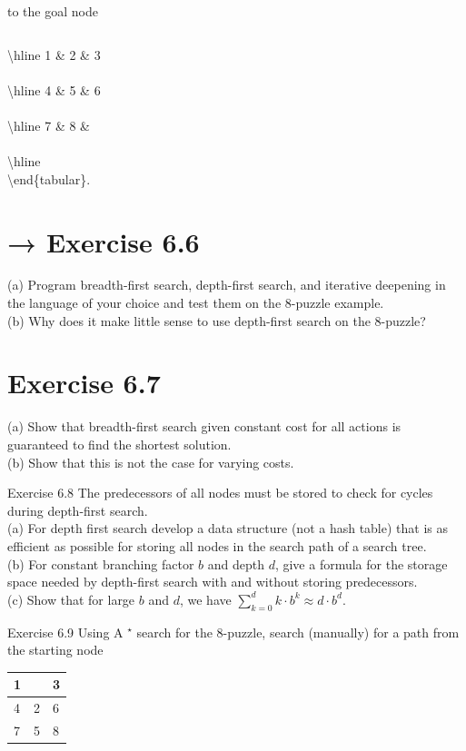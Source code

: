 \documentclass[10pt]{article}
\begin{document}
 to the goal node \begin{tabular}{|l|l|l|l|}
\end{tabular}

\textbackslash hline 1 \& 2 \& 3 \\
\\
\textbackslash hline 4 \& 5 \& 6 \\
\\
\textbackslash hline 7 \& 8 \& \\
\\
\textbackslash hline\\
\textbackslash end\{tabular\}.

\section*{→ Exercise 6.6}
(a) Program breadth-first search, depth-first search, and iterative deepening in the language of your choice and test them on the 8-puzzle example.\\
(b) Why does it make little sense to use depth-first search on the 8-puzzle?

\section*{Exercise 6.7}
(a) Show that breadth-first search given constant cost for all actions is guaranteed to find the shortest solution.\\
(b) Show that this is not the case for varying costs.

Exercise 6.8 The predecessors of all nodes must be stored to check for cycles during depth-first search.\\
(a) For depth first search develop a data structure (not a hash table) that is as efficient as possible for storing all nodes in the search path of a search tree.\\
(b) For constant branching factor $b$ and depth $d$, give a formula for the storage space needed by depth-first search with and without storing predecessors.\\
(c) Show that for large $b$ and $d$, we have $\sum_{k=0}^{d} k \cdot b^{k} \approx d \cdot b^{d}$.

Exercise 6.9 Using A ${ }^{\star}$ search for the 8-puzzle, search (manually) for a path from the starting node

\begin{center}
\begin{tabular}{||l|l|l||}
\hline
1 &  & 3 \\
\hline
4 & 2 & 6 \\
\hline
7 & 5 & 8 \\
\hline
\end{tabular}
\end{center}
\end{document}
